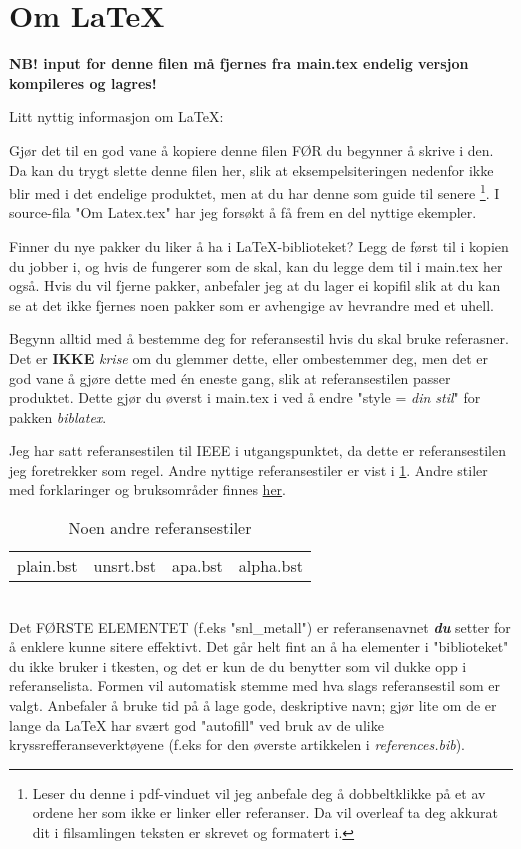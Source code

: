 \pagebreak
\section{Om LaTeX}

\textbf{NB! input for denne filen må fjernes fra main.tex endelig versjon kompileres og lagres!}

Litt nyttig informasjon om LaTeX:

Gjør det til en god vane å kopiere denne filen FØR du begynner å skrive i den. Da kan du trygt slette denne filen her, slik at eksempelsiteringen nedenfor ikke blir med i det endelige produktet, men at du har denne som guide til senere \footnote{Leser du denne i pdf-vinduet vil jeg anbefale deg å dobbeltklikke på et av ordene her som ikke er linker eller referanser. Da vil overleaf ta deg akkurat dit i filsamlingen teksten er skrevet og formatert i.}. 
I source-fila "Om Latex.tex" har jeg forsøkt å få frem en del nyttige ekempler.

Finner du nye pakker du liker å ha i LaTeX-biblioteket? Legg de først til i kopien du jobber i, og hvis de fungerer som de skal, kan du legge dem til i main.tex her også. Hvis du vil fjerne pakker, anbefaler jeg at du lager ei kopifil slik at du kan se at det ikke fjernes noen pakker som er avhengige av hevrandre med et uhell. 

Begynn alltid med å bestemme deg for referansestil hvis du skal bruke referasner. Det er \textbf{IKKE} \textit{krise} om du glemmer dette, eller ombestemmer deg, men det er god vane å gjøre dette med én eneste gang, slik at referansestilen passer produktet. Dette gjør du øverst i main.tex i ved å endre "style = \textit{din stil}" for pakken \textit{biblatex}.

Jeg har satt referansestilen til IEEE i utgangspunktet, da dette er referansestilen jeg foretrekker som regel. Andre nyttige referansestiler er vist i \ref{lst:referansestiler}. Andre stiler med forklaringer og bruksområder finnes
\hyperlink{https://www.reed.edu/cis/help/LaTeX/bibtexstyles.html}{her}. 
\\ %
\begin{table}[!h] 
    \centering
    \caption{Noen andre referansestiler}
    \begin{tabular}{cccc}
        \hline
        plain.bst & unsrt.bst & apa.bst & alpha.bst\\
        \end{tabular}
    \label{lst:referansestiler}
\end{table}
\\
Det FØRSTE ELEMENTET (f.eks "snl\_metall") er referansenavnet 
\textbf{\textit{du}} setter for å enklere kunne sitere effektivt. 
Det går helt fint an å ha elementer i "biblioteket" du ikke bruker i tkesten, og det er kun de du benytter som vil dukke opp i referanselista. Formen vil automatisk stemme med hva slags referansestil som er valgt. Anbefaler å bruke tid på å lage gode, deskriptive navn; gjør lite om de er lange da LaTeX har svært god "autofill" ved bruk av de ulike kryssrefferanseverktøyene 
(f.eks \cite{snl_metall} for den øverste artikkelen i \textit{references.bib}).
